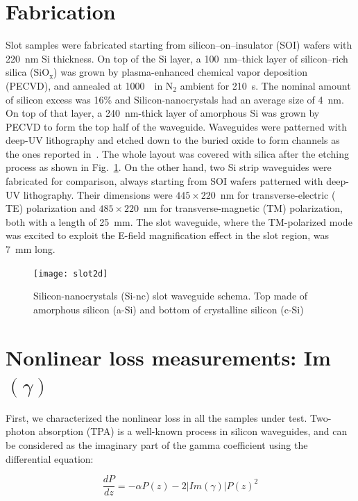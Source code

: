 \documentclass[10pt,letterpaper]{article}
\begin{document}
\section{Fabrication}
Slot samples were fabricated starting from silicon--on--insulator (SOI) wafers with 220~nm Si thickness. On top of the Si layer, a 100~nm--thick layer of silicon--rich silica ($ \mathrm{SiO_x} $) was grown by plasma-enhanced chemical vapor deposition (PECVD), and annealed at 1000~\textcelsius ~in $ \mathrm{N}_2 $ ambient for 210~s. The nominal amount of silicon excess was 16\% and Silicon-nanocrystals had an average size of 4~nm. On top of that layer, a 240~nm-thick layer of amorphous Si was grown by PECVD to form the top half of the waveguide. Waveguides were patterned with deep-UV lithography and etched down to the buried oxide to form channels as the ones reported in~\cite{Martinez2010a, Trita2011}. The whole layout was covered with silica after the etching process as shown in Fig.~\ref{fig:semSlot}. On the other hand, two Si strip waveguides were fabricated for comparison, always starting  from SOI wafers patterned with deep-UV lithography. Their dimensions were $445\times220$~nm for transverse-electric (
TE) polarization and $485\times220$~nm for transverse-magnetic 
(TM) polarization, both with a length of 25~mm. The slot waveguide, where the TM-polarized mode was excited to exploit the E-field magnification effect in the slot region, was 7~mm long.


\begin{figure}[htb]
\centering
\texttt{[image: slot2d]}%
\caption{Silicon-nanocrystals (Si-nc) slot waveguide schema. Top made of amorphous silicon (a-Si) and bottom of crystalline silicon (c-Si)}
\label{fig:semSlot}
\end{figure}


\section{Nonlinear loss measurements: Im$ (\gamma) $}
\label{sec:imGamma}
First, we characterized the nonlinear loss in all the samples under test.  Two-photon absorption (TPA) is a well-known process in silicon waveguides, and can be considered as the imaginary part of the gamma coefficient using the differential equation:

\begin{equation}
\frac{dP}{dz} = -\alpha P(z) - 2|Im(\gamma)| P(z)^2 
\label{eq:differentialTPA}
\end{equation}
\end{document}
